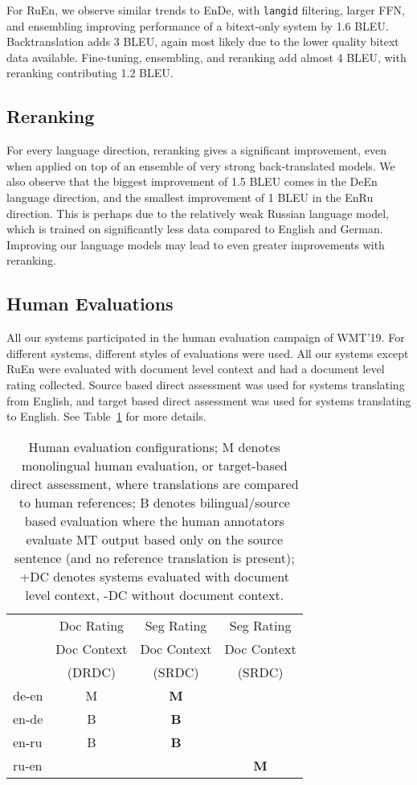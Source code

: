 \documentclass[11pt,a4paper]{article}
\newcommand{\detoen}{DeEn}
\newcommand{\entoru}{EnRu}
\newcommand{\rutoen}{RuEn}
\newcommand{\enbide}{EnDe}
\begin{document}
For \rutoen{}, we observe similar trends to \enbide{}, with \texttt{langid} filtering, larger FFN, and ensembling improving performance of a bitext-only system by 1.6 BLEU.
Backtranslation adds 3 BLEU, again most likely due to the lower quality bitext data available.
Fine-tuning, ensembling, and reranking add almost 4 BLEU, with reranking contributing 1.2 BLEU.

\subsection{Reranking}
For every language direction, reranking gives a significant improvement, even when applied on top of an ensemble of very strong back-translated models. 
We also observe that the biggest improvement of 1.5 BLEU comes in the \detoen{} language direction, and the smallest improvement of 1 BLEU in the \entoru{} direction.
This is perhaps due to the relatively weak Russian language model, which is trained on significantly less data compared to English and German.
Improving our language models may lead to even greater improvements with reranking.


\subsection{Human Evaluations}

All our systems participated in the human evaluation campaign of WMT'19.
For different systems, different styles of evaluations were used. 
All our systems except \rutoen{} were evaluated with document level context and had a document level rating collected.
Source based direct assessment was used for systems translating from English, and target based direct assessment was used for systems translating to English.
See Table~\ref{tab:types_of_human_eval} for more details. 

\begin{table}[t]
\small
\centering
\begin{tabular}{lccc}
\toprule
         & Doc Rating  & Seg Rating         & Seg Rating \\
         & Doc Context    & Doc Context           & Doc Context \\

         & (DRDC) & (SRDC) & (SRDC) \\ 
\midrule
de-en & M & {\bf M}  &   \\
en-de & B & {\bf B}  &   \\
en-ru & B & {\bf B}  &   \\
ru-en &  &  & {\bf M}  \\
\bottomrule
\end{tabular}
\caption{Human evaluation configurations;
M denotes monolingual human evaluation, or target-based direct assessment, where translations are compared to human references; 
B denotes bilingual/source based evaluation where the human annotators evaluate MT
output based only on the source sentence (and no reference translation is present); 
+DC denotes systems evaluated with document level context, 
-DC without document context.}
\label{tab:types_of_human_eval}
\end{table}
\end{document}
